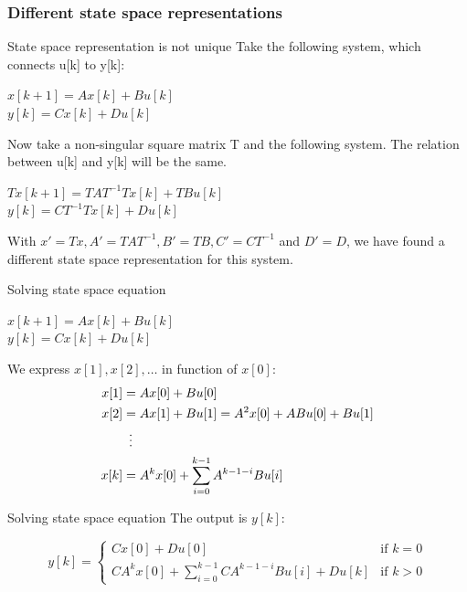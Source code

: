 \begin{frame}
	\frametitle{Different state space representations}
	\begin{alertblock}{State space representation is not unique}
		Take the following system, which connects u[k] to y[k]:
		\begin{center}
			$x[k+1] = A x[k] + B u[k]$ \\
			$y[k] = C x[k] + D u[k] $ 
		\end{center}
		Now take a non-singular square matrix T and the following system. The relation between u[k] and y[k] will be the same.	
		\begin{center}
			$Tx[k+1] = TAT^{-1}Tx[k] + TBu[k]$\\
			$y[k] = C T^{-1}Tx[k] + Du[k]$
		\end{center}
		With $x' = Tx, A' = TAT^{-1},B' = TB,C' = CT^{-1}$ and $D'=D$,  we have found a different state space representation for this system.
		
	\end{alertblock}
\end{frame}
\begin{frame}
	\begin{block}{Solving state space equation}
			\begin{center}
				$x[k+1] = A x[k] + B u[k]$ \\
				$y[k] = C x[k] + D u[k] $ 
			\end{center}
			We express $x[1],x[2],\dots$ in function of $x[0]$:
			\begin{align*}
					x[1] &= Ax[0]+Bu[0]\\
					x[2] &= Ax[1] + Bu[1] = A^2x[0]+ABu[0]+ Bu[1]\\
					&\hspace{0.5em} \vdots\\
					x[k] &= A^kx[0] + \sum\limits_{i=0}^{k-1} A^{k-1-i}Bu[i]
			\end{align*}
	\end{block}
\end{frame}
\begin{frame}
	\begin{block}{Solving state space equation}
			The output is $y[k]$:
			\vspace{-2.5em}
			\begin{center}
				\[ y[k] = \begin{cases} Cx[0] + Du[0] & \text{if }  k = 0 \\
				 CA^kx[0]+\sum\limits_{i=0 }^{k-1} CA^{k  -1  -i}Bu[i] +D u[k] & \text{if } k > 0 \end{cases} \]
			\end{center}
	\end{block}
\end{frame}
